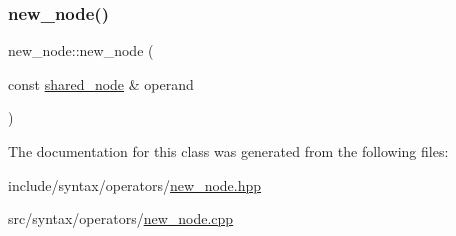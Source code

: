 \subsubsection{\texorpdfstring{new\+\_\+node()}{new\_node()}}
{\footnotesize\ttfamily new\+\_\+node\+::new\+\_\+node (\begin{DoxyParamCaption}\item[{const \hyperlink{namespacejawe_a3f307481d921b6cbb50cc8511fc2b544}{shared\+\_\+node} \&}]{operand }\end{DoxyParamCaption})}



The documentation for this class was generated from the following files\+:\begin{DoxyCompactItemize}
\item 
include/syntax/operators/\hyperlink{new__node_8hpp}{new\+\_\+node.\+hpp}\item 
src/syntax/operators/\hyperlink{new__node_8cpp}{new\+\_\+node.\+cpp}\end{DoxyCompactItemize}
